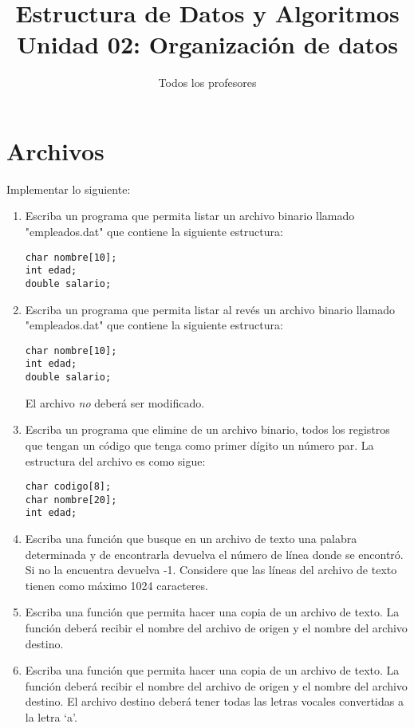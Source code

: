 \documentclass[a4paper]{article}
\title{Estructura de Datos y Algoritmos \\
  \large Unidad 02: Organización de datos}
\author{Todos los profesores}
\begin{document}
\maketitle

\section{Archivos}
Implementar lo siguiente:
\begin{enumerate}
  \item Escriba un programa que permita listar un archivo binario llamado 
        "empleados.dat" que contiene la siguiente estructura:

\begin{lstlisting}
char nombre[10];
int edad;
double salario;
\end{lstlisting}

  \item Escriba un programa que permita listar al revés un archivo binario
        llamado "empleados.dat" que contiene la siguiente estructura:

\begin{lstlisting}
char nombre[10];
int edad;
double salario;
\end{lstlisting}

	El archivo \emph{no} deberá ser modificado.
  \item Escriba un programa que elimine de un archivo binario, todos los
        registros que tengan un código que tenga como primer dígito un
        número par. La estructura del archivo es como sigue:

\begin{lstlisting}
char codigo[8];
char nombre[20];
int edad;
\end{lstlisting}

  \item Escriba una función que busque en un archivo de texto una palabra
        determinada y de encontrarla devuelva el número de línea donde se
        encontró. Si no la encuentra devuelva -1. Considere que las líneas
        del archivo de texto tienen como máximo 1024 caracteres.

  \item Escriba una función que permita hacer una copia de un archivo de texto.
        La función deberá recibir el nombre del archivo de origen y el nombre
        del archivo destino.

  \item Escriba una función que permita hacer una copia de un archivo de
        texto. La función deberá recibir el nombre del archivo de origen y
        el nombre del archivo destino. El archivo destino deberá tener todas
        las letras vocales convertidas a la letra ‘a’.


\end{enumerate}
\end{document}
